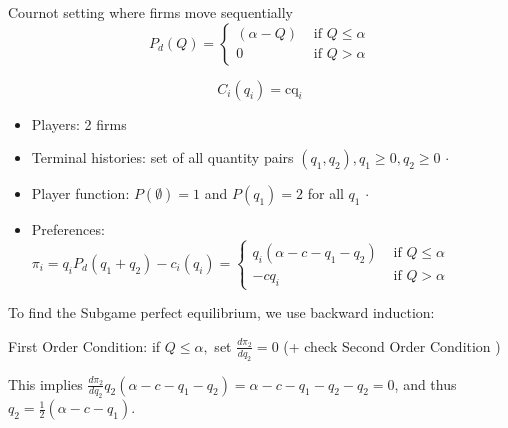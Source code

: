\begin{illustration}
      Cournot setting where firms move sequentially
      \[
            P_{d}(Q) = \left\{
            \begin{array}{ll}
                  (\alpha-Q) & \text { if } Q \leq \alpha \\
                  0          & \text { if } Q>\alpha
            \end{array}\right.
      \]

      \[
            C_{i}(q_{i})=\mathrm{cq}_{i}
      \]

      \begin{itemize}
            \item Players: 2 firms
            \item Terminal histories: set of all quantity pairs $(q_{1}, q_{2}), q_{1} \geq 0, q_{2} \geq 0$ $\cdot$
            \item Player function: $P(\emptyset)=1$ and $P\left(q_{1}\right)=2$ for all $q_{1}$
                  $\cdot$
            \item Preferences: $\pi_{i}=q_{i} P_{d}\left(q_{1}+q_{2}\right)-c_{i}\left(q_{i}\right)=\left\{\begin{array}{ll}q_{i}\left(\alpha-c-q_{1}-q_{2}\right) & \text { if } Q \leq \alpha \\ -c q_{i} & \text { if } Q>\alpha\end{array}\right.$
      \end{itemize}

      To find the Subgame perfect equilibrium, we use backward induction:

      First Order Condition: if $Q \leq \alpha,$ set $\frac{d\pi_2}{dq_2} = 0$ (+ check Second Order Condition )

      This implies $\frac{d\pi_2}{dq_2} q_{2}(\alpha-c-q_{1}-q_{2}) =  \alpha-c-q_{1}-q_{2}-q_{2}=0$, and thus $q_{2}=\frac{1}{2}(\alpha-c-q_{1})$.


\end{illustration}

